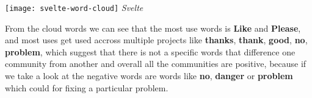 \begin{center}
    \texttt{[image: svelte-word-cloud]}    
    \textit{Svelte}
\end{center}

From the cloud words we can see that the most use words is \textbf{Like} and \textbf{Please}, and most uses get used accross multiple projects like \textbf{thanks}, \textbf{thank}, \textbf{good}, \textbf{no}, \textbf{problem}, which suggest that there is not a specific words that difference one community from another and overall all the communities are positive, because if we take a look at the negative words are words like \textbf{no}, \textbf{danger} or \textbf{problem} which could for fixing a particular problem.


